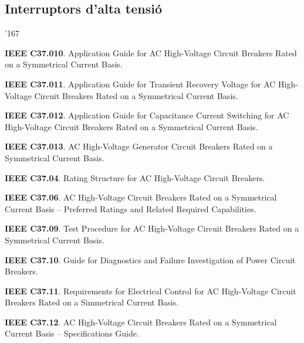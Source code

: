 \subsection*{Interruptors d'alta tensi\'{o}}
\begin{dinglist}{'167}
    \item \textbf{IEEE C37.010}. Application Guide for AC High-Voltage Circuit Breakers Rated on a Symmetrical Current Basis.
    \item \textbf{IEEE C37.011}. Application Guide for Transient Recovery Voltage for AC High-Voltage Circuit Breakers Rated on a Symmetrical Current Basis.
    \item \textbf{IEEE C37.012}. Application Guide for Capacitance Current Switching for AC High-Voltage Circuit Breakers Rated on a Symmetrical Current Basis.
    \item \textbf{IEEE C37.013}. AC High-Voltage Generator Circuit Breakers Rated on a Symmetrical Current Basis.
    \item \textbf{IEEE C37.04}. Rating Structure for AC High-Voltage Circuit Breakers.
    \item \textbf{IEEE C37.06}. AC High-Voltage Circuit Breakers Rated on a Symmetrical Current Basis -- Preferred Ratings and Related Required Capabilities.
    \item \textbf{IEEE C37.09}. Test Procedure for AC High-Voltage Circuit Breakers Rated on a Symmetrical Current Basis.
    \item \textbf{IEEE C37.10}. Guide for Diagnostics and Failure Investigation of Power Circuit Breakers.
    \item \textbf{IEEE C37.11}. Requirements for Electrical Control for AC High-Voltage Circuit Breakers Rated on a Simmetrical Current Basis.
    \item \textbf{IEEE C37.12}. AC High-Voltage Circuit Breakers Rated on a Symmetrical Current Basis -- Specifications Guide.
\end{dinglist}


